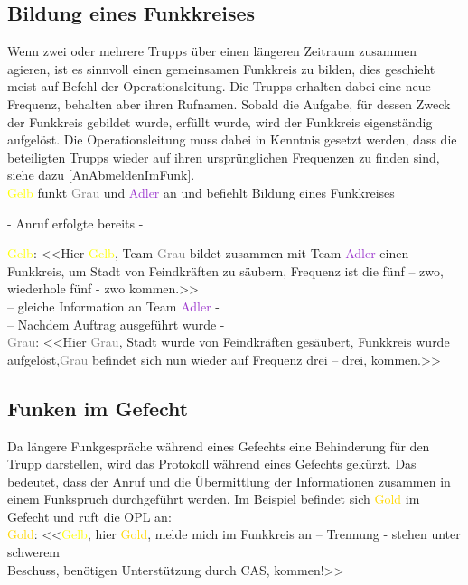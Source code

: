 \subsection{Bildung eines Funkkreises}
	Wenn zwei oder mehrere Trupps über einen längeren Zeitraum zusammen agieren, ist es sinnvoll einen gemeinsamen Funkkreis zu bilden, dies geschieht meist auf Befehl der Operationsleitung. Die Trupps erhalten dabei eine neue Frequenz, behalten aber ihren Rufnamen. Sobald die Aufgabe, für dessen Zweck der Funkkreis gebildet wurde, erfüllt wurde, wird der Funkkreis eigenständig aufgelöst. Die Operationsleitung muss dabei in Kenntnis gesetzt werden, dass die beteiligten Trupps wieder auf ihren ursprünglichen Frequenzen zu finden sind, siehe dazu \autoref{AnAbmeldenImFunk}. \\
	\textcolor{yellow}{Gelb} funkt \textcolor{gray}{Grau} und \textcolor{DarkOrchid}{Adler} an und befiehlt Bildung eines Funkkreises \\
		\begin{center}
		- Anruf erfolgte bereits -
		\end{center}
	\textcolor{yellow}{Gelb}: <<Hier \textcolor{yellow}{Gelb}, Team \textcolor{gray}{Grau} bildet zusammen mit Team \textcolor{DarkOrchid}{Adler} einen Funkkreis, um Stadt von Feindkräften zu säubern, Frequenz ist die fünf – zwo, wiederhole fünf - zwo kommen.>> \\
	– gleiche Information an Team \textcolor{DarkOrchid}{Adler} - \\
	– Nachdem Auftrag ausgeführt wurde - \\
	\textcolor{gray}{Grau}: <<Hier \textcolor{gray}{Grau}, Stadt wurde von Feindkräften gesäubert, Funkkreis wurde aufgelöst,\textcolor{gray}{Grau} befindet sich nun wieder auf Frequenz drei – drei, kommen.>> \\

\subsection{Funken im Gefecht}
	Da längere Funkgespräche während eines Gefechts eine Behinderung für den Trupp darstellen, wird das Protokoll während eines Gefechts gekürzt. Das bedeutet, dass der Anruf und die Übermittlung der Informationen zusammen in einem Funkspruch durchgeführt werden. Im Beispiel befindet sich \textcolor{gold}{Gold} im Gefecht und ruft die OPL an: \\
	\textcolor{gold}{Gold}: <<\textcolor{yellow}{Gelb}, hier \textcolor{gold}{Gold}, melde mich im Funkkreis an – Trennung - stehen unter schwerem \\
	Beschuss, benötigen Unterstützung durch CAS, kommen!>> \\

